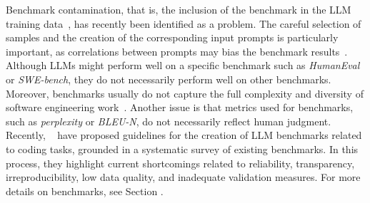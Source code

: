 
Benchmark contamination, that is, the inclusion of the benchmark in the LLM training data~\cite{DBLP:journals/corr/abs-2410-16186}, has recently been identified as a problem.
The careful selection of samples and the creation of the corresponding input prompts is particularly important, as correlations between prompts may bias the benchmark results~\cite{DBLP:conf/acl/SiskaMAB24}.
Although LLMs might perform well on a specific benchmark such as \emph{HumanEval} or \emph{SWE-bench}, they do not necessarily perform well on other benchmarks.
Moreover, benchmarks usually do not capture the full complexity and diversity of software engineering work~\cite{Chandra2025benchmarks}.
Another issue is that metrics used for benchmarks, such as \emph{perplexity} or \emph{BLEU-N}, do not necessarily reflect human judgment.
Recently, \citeauthor{cao2025should}~\cite{cao2025should} have proposed guidelines for the creation of LLM benchmarks related to coding tasks, grounded in a systematic survey of existing benchmarks. 
In this process, they highlight current shortcomings related to reliability, transparency, irreproducibility, low data quality, and inadequate validation measures.
For more details on benchmarks, see Section \benchmarksmetrics. 
